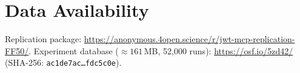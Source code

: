 \documentclass[conference]{IEEEtran}
\newcommand{\anon}[2]{#1}
\begin{document}
\vspace{-10pt}\section*{Data Availability}
\vspace{-5pt}
{\small Replication package:
\anon{\url{https://anonymous.4open.science/r/jwt-mcp-replication-FF50/}}{\url{https://github.com/andylegear/jwt-mcp-replication}}.
Experiment database (${\approx}161$\,MB, 52{,}000 runs):
\url{https://osf.io/5zd42/} (SHA-256: \texttt{ac1de7ac\ldots fdc5c0e}).}



\end{document}
